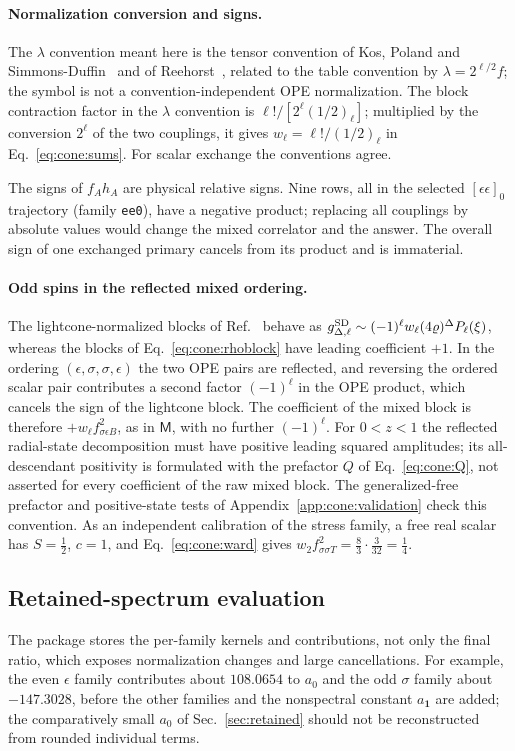 \documentclass[11pt,a4paper]{article}
\numberwithin{equation}{section}
\begin{document}
\paragraph{Normalization conversion and signs.} The $\lambda$ convention meant here is the tensor convention of
Kos, Poland and Simmons-Duffin~\cite{Kos:2014bka} and of Reehorst~\cite{Reehorst:2021}, related to the table convention by $\lambda=2^{\ell/2}f$; the symbol is
not a convention-independent OPE normalization. The block contraction factor in the $\lambda$ convention is
$\ell!/[2^\ell(1/2)_\ell]$; multiplied by the conversion $2^\ell$ of the two couplings, it gives $w_\ell=\ell!/(1/2)_\ell$
in Eq.~\eqref{eq:cone:sums}. For scalar exchange the conventions agree.

The signs of $f_Ah_A$ are physical relative signs. Nine rows, all in the selected $[\epsilon\epsilon]_0$ trajectory
(family \texttt{ee0}), have a negative product; replacing all couplings by absolute values would change the mixed
correlator and the answer. The overall sign of one exchanged primary cancels from its product and is immaterial.

\paragraph{Odd spins in the reflected mixed ordering.} The lightcone-normalized blocks of
Ref.~\cite{Simmons-Duffin:2016wlq} behave as $g^{\rm SD}_{\Delta,\ell}\sim(-1)^\ell w_\ell(4\varrho)^\Delta P_\ell(\xi)$,
whereas the blocks of Eq.~\eqref{eq:cone:rhoblock} have leading coefficient $+1$. In the ordering
$(\epsilon,\sigma,\sigma,\epsilon)$ the two OPE pairs are reflected, and reversing the ordered scalar pair contributes a
second factor $(-1)^\ell$ in the OPE product, which cancels the sign of the lightcone block. The coefficient of the
mixed block is therefore $+w_\ell f_{\sigma\epsilon B}^2$, as in $\mathsf M$, with no further $(-1)^\ell$. For
$0<z<1$ the reflected radial-state decomposition must have positive leading squared amplitudes; its all-descendant
positivity is formulated with the prefactor $Q$ of Eq.~\eqref{eq:cone:Q}, not asserted for every coefficient of the
raw mixed block. The generalized-free prefactor and positive-state tests of Appendix~\ref{app:cone:validation} check this
convention. As an independent calibration of the stress family, a free real scalar has $S=\frac12$, $c=1$, and
Eq.~\eqref{eq:cone:ward} gives $w_2f_{\sigma\sigma T}^2=\frac83\cdot\frac3{32}=\frac14$.

\subsection{Retained-spectrum evaluation}\label{app:cone:retained}
The package stores the per-family kernels and contributions, not only the final ratio, which exposes normalization
changes and large cancellations. For example, the even $\epsilon$ family contributes about $108.0654$ to $a_0$ and the
odd $\sigma$ family about $-147.3028$, before the other families and the nonspectral constant $a_{\mathbf 1}$ are
added; the comparatively small $a_0$ of Sec.~\ref{sec:retained} should not be reconstructed from rounded individual
terms.
\end{document}
